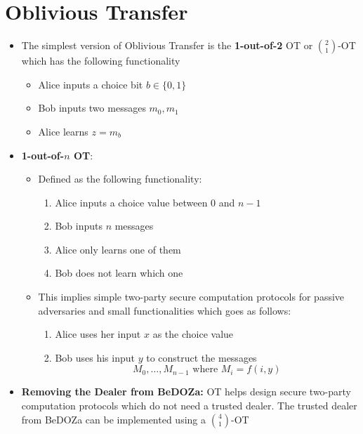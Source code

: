 \section{Oblivious Transfer}
\begin{itemize}
    \item The simplest version of Oblivious Transfer is the \textbf{1-out-of-2} OT or $2 \choose 1$-OT which has the following functionality
    \begin{itemize}
        \item Alice inputs a choice bit $b \in \{0,1\}$
        \item Bob inputs two messages $m_0, m_1$ 
        \item Alice learns $z = m_b$
    \end{itemize}
    \item \textbf{1-out-of-$n$ OT}: 
    \begin{itemize}
        \item Defined as the following functionality:
        \begin{enumerate}
            \item Alice inputs a choice value between $0$ and $n-1$
            \item Bob inputs $n$ messages 
            \item Alice only learns one of them 
            \item Bob does not learn which one
        \end{enumerate}
        \item This implies simple two-party secure computation protocols for passive adversaries and small functionalities which goes as follows:
        \begin{enumerate}
            \item Alice uses her input $x$ as the choice value
            \item Bob uses his input $y$ to construct the messages 
            \begin{equation*}
                M_0, \dots, M_{n-1} \text{ where } M_i = f(i,y)
            \end{equation*}
        \end{enumerate}
    \end{itemize}
    \item \textbf{Removing the Dealer from BeDOZa:} OT helps design secure two-party computation protocols which do not need a trusted dealer. The trusted dealer from BeDOZa can be implemented using a $4 \choose 1$-OT
    \begin{itemize}

\end{itemize}
\end{itemize}
